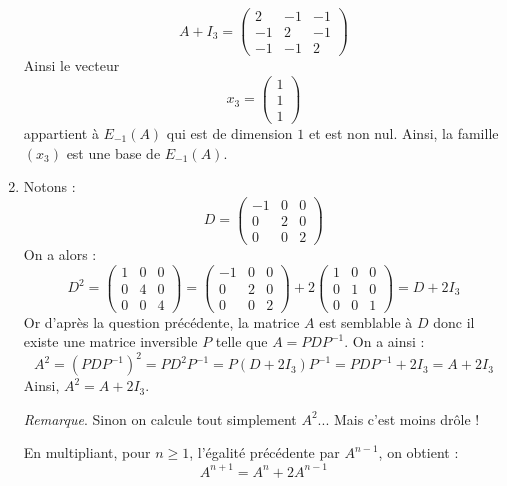 \documentclass[a4paper,twoside,french,10pt]{VcCours}
\begin{document}
\begin{enumerate}
$$ A+I_3  = \left(\begin{array}{ccc}
2 & -1 & -1\\
-1 & 2 & -1\\
-1 & -1 & 2
\end{array}\right)$$
Ainsi le vecteur 
$$ x_3 = \begin{pmatrix}
1 \\
1 \\
1
\end{pmatrix}$$
appartient à $E_{-1}(A)$ qui est de dimension $1$ et est non nul. Ainsi, la famille $(x_3)$ est une base de $E_{-1}(A)$.
\item Notons :
 \[D = \left( {\begin{array}{*{20}{c}}
{ - 1}&0&0\\
0&2&0\\
0&0&2
\end{array}} \right)\]
On a alors :
 \[{D^2} = \left( {\begin{array}{*{20}{c}}
1&0&0\\
0&4&0\\
0&0&4
\end{array}} \right) = \left( {\begin{array}{*{20}{c}}
{ - 1}&0&0\\
0&2&0\\
0&0&2
\end{array}} \right) + 2\left( {\begin{array}{*{20}{c}}
1&0&0\\
0&1&0\\
0&0&1
\end{array}} \right) = D +2 {I_3}\]
Or d'après la question précédente, la matrice $A$ est semblable à $D$ donc il existe une matrice inversible $P$ telle que $A=PDP^{-1}$. On a ainsi :
$$ A^2 = (PDP^{-1})^2 = PD^2P^{-1} = P(D+2I_3)P^{-1} = PDP^{-1} + 2I_3 = A+2 I_3$$
Ainsi, $A^2 = A + 2 I_3$. 


\textit{Remarque}. Sinon on calcule tout simplement $A^2$... Mais c'est moins drôle !


En multipliant, pour $n \geq 1$, l'égalité précédente par $A^{n-1}$, on obtient :
$$A^{n+1} = A^{n} + 2 A^{n-1}$$


\end{enumerate}
\end{document}

